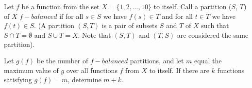 Let $f$ be a function from the set $X = \{1,2, \dots, 10\}$ to itself. Call a partition ($S$, $T$) of $X$ $f-balanced$ if for all $s \in S$ we have $f(s) \in T$ and for all $t \in T$ we have $f(t) \in S$. (A partition $(S, T)$ is a pair of subsets $S$ and $T$ of $X$ such that $S\cap T = \emptyset$ and $S \cup T = X$. Note that $(S, T)$ and $(T, S)$ are considered the same partition).
    
Let $g(f)$ be the number of $f-balanced$ partitions, and let $m$ equal the maximum value of $g$ over all functions $f$ from $X$ to itself. If there are $k$ functions satisfying $g(f) = m$, determine $m+k$.